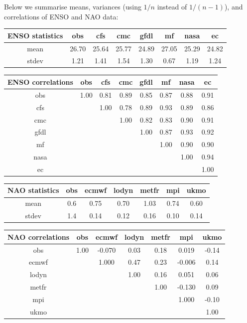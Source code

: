 \documentclass[12pt]{article}
\begin{document}
Below we summarise means, variances (using $1/n$ instead of $1/(n-1)$), and correlations of ENSO and NAO data:
\begin{center}
\begin{tabular}{c|ccccccc}
\textbf{ENSO statistics} &  obs  & cfs   &cmc  &gfdl    &mf  &nasa    &ec \\
\hline
mean &26.70 &25.64 &25.77 &24.89 &27.05 &25.29 &24.82 \\
stdev & 1.21 &1.41 &1.54 &1.30 &0.67 &1.19 &1.24\\
\end{tabular}

\begin{tabular}{c|ccccccc}
\textbf{ENSO correlations}      &obs  &cfs  &cmc &gfdl   &mf &nasa   &ec\\
\hline
obs  &1.00 &0.81 &0.89 &0.85 &0.87 &0.88 &0.91\\
cfs  & &1.00 &0.78 &0.89 &0.93 &0.89 &0.86\\
cmc  & & &1.00 &0.82 &0.83 &0.90 &0.91\\
gfdl & & & &1.00 &0.87 &0.93 &0.92\\
mf   & & & & &1.00 &0.90 &0.90\\
nasa & & & & & &1.00 &0.94\\
ec   & & & & & & &1.00
\end{tabular}
\end{center}



\begin{center}
\begin{tabular}{c|cccccc}
\textbf{NAO statistics} & obs  &ecmwf  &lodyn  &metfr    &mpi   &ukmo \\
\hline
mean &   0.6  &0.75  &0.70 &1.03  &0.74  &0.60 \\
stdev &  1.4 &0.14 &0.12 &0.16 &0.10 &0.14 \\
\end{tabular}

\begin{tabular}{c|cccccc}
\textbf{NAO correlations} &obs  &ecmwf &lodyn &metfr    &mpi  &ukmo\\
\hline
obs    &1.00 &-0.070  &0.03  &0.18  &0.019 &-0.14\\
ecmwf &  &1.000  &0.47  &0.23 &-0.006  &0.14\\
lodyn  &  &  &1.00  &0.16  &0.051  &0.06\\
metfr  &  &  &  &1.00 &-0.130  &0.09\\
mpi    & &  & &  &1.000 &-0.10\\
ukmo  &  &  &  & &  &1.00
\end{tabular}
\end{center}
\end{document}
